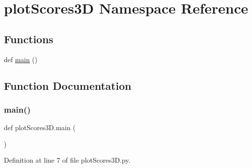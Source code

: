 \hypertarget{namespaceplot_scores3_d}{}\section{plot\+Scores3D Namespace Reference}
\label{namespaceplot_scores3_d}
\subsection*{Functions}
\begin{DoxyCompactItemize}
\item 
def \hyperlink{namespaceplot_scores3_d_afea85eec0fbbdfa1e10b19aa91390687}{main} ()
\end{DoxyCompactItemize}


\subsection{Function Documentation}
\mbox{\label{namespaceplot_scores3_d_afea85eec0fbbdfa1e10b19aa91390687}} 
\subsubsection{\texorpdfstring{main()}{main()}}
{\footnotesize\ttfamily def plot\+Scores3\+D.\+main (\begin{DoxyParamCaption}{ }\end{DoxyParamCaption})}



Definition at line 7 of file plot\+Scores3\+D.\+py.

